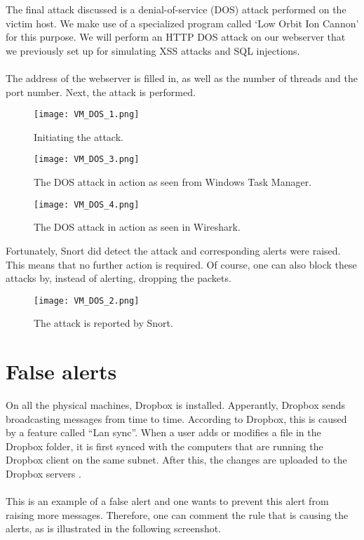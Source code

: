 The final attack discussed is a denial-of-service (DOS) attack performed on the victim host. We make use of a specialized program called `Low Orbit Ion Cannon' for this purpose. We will perform an HTTP DOS attack on our webserver that we previously set up for simulating XSS attacks and SQL injections. \\ \\
The address of the webserver is filled in, as well as the number of threads and the port number. Next, the attack is performed.

\begin{figure}[h]
    \centering
    \texttt{[image: VM\_DOS\_1.png]}
    \caption{Initiating the attack.}
\end{figure}

\begin{figure}[h]
    \centering
    \texttt{[image: VM\_DOS\_3.png]}
    \caption{The DOS attack in action as seen from Windows Task Manager.}
\end{figure}
\clearpage
\begin{figure}[h]
    \centering
    \texttt{[image: VM\_DOS\_4.png]}
    \caption{The DOS attack in action as seen in Wireshark.}
\end{figure}
Fortunately, Snort did detect the attack and corresponding alerts were raised. This means that no further action is required. Of course, one can also block these attacks by, instead of alerting, dropping the packets.
\begin{figure}[h]
    \centering
    \texttt{[image: VM\_DOS\_2.png]}
    \caption{The attack is reported by Snort.}
\end{figure}

\clearpage

\section{False alerts}

On all the physical machines, Dropbox is installed. Apperantly, Dropbox sends broadcasting messages from time to time. According to Dropbox, this is caused by a feature called ``Lan sync''. When a user adds or modifies a file in the Dropbox folder, it is first synced with the computers that are running the Dropbox client on the same subnet. After this, the changes are uploaded to the Dropbox servers \citep{Dropbox}. \\ \\
This is an example of a false alert and one wants to prevent this alert from raising more messages. Therefore, one can comment the rule that is causing the alerts, as is illustrated in the following screenshot.

